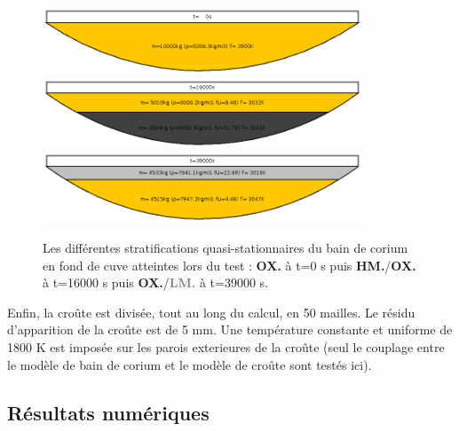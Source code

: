\begin{figure}
\centering
\includegraphics[width=0.85\textwidth, keepaspectratio=true]{Figures/coriumPool_t=00000.png}\\
\includegraphics[width=0.85\textwidth, keepaspectratio=true]{Figures/coriumPool_t=16000.png}\\
\includegraphics[width=0.85\textwidth, keepaspectratio=true]{Figures/coriumPool_t=39000.png}
\caption{Les différentes stratifications quasi-stationnaires du bain de corium en fond de cuve atteintes lors du test : \textcolor{yellow!75!black}{\textbf{OX.}} à t=0 s puis \textbf{HM.}/\textcolor{yellow!75!black}{\textbf{OX.}} à t=16000 s puis \textcolor{yellow!75!black}{\textbf{OX.}}/\textcolor{gray}{\textbf{LM.}} à t=39000 s.}
\label{fig:stratifications_bains}
\end{figure}

Enfin, la croûte est divisée, tout au long du calcul, en 50 mailles. Le résidu d'apparition de la croûte est de 5 mm. Une température constante et uniforme de 1800 K est imposée sur les parois exterieures de la croûte (seul le couplage entre le modèle de bain de corium et le modèle de croûte sont testés ici).

\subsection{Résultats numériques}


